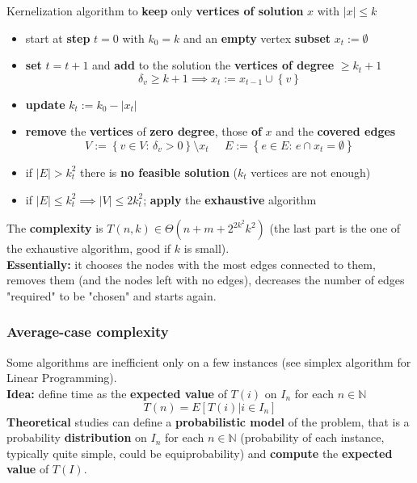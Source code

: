 Kernelization algorithm to \textbf{keep} only \textbf{vertices of solution} $x$ with $|x| \leq k$
\begin{itemize}
	\item start at \textbf{step} $t = 0$ with $k_0 = k$ and an \textbf{empty} vertex \textbf{subset} $x_t := \emptyset$
	\item \textbf{set} $t = t + 1$ and \textbf{add} to the solution the \textbf{vertices of degree} $\geq k_t + 1$
	$$ \delta_v \geq k+1 \implies x_t := x_{t-1} \cup \left\{v\right\} $$
	\item \textbf{update} $k_t := k_0 − |x_t|$
	\item \textbf{remove} the \textbf{vertices} of \textbf{zero degree}, those \textbf{of} $x$ and the \textbf{covered edges}
	$$ V := \left\{v \in V : \, \delta_v > 0\right\} \setminus x_t \;\;\;\;\; E := \left\{e \in E : \, e \cap x_t = \emptyset \right\} $$
	\item if $|E| > k_t^2$ there is \textbf{no feasible solution} ($k_t$ vertices are not enough)
	\item if $|E| \leq k_t^2 \implies |V| \leq 2k_t^2$; \textbf{apply} the \textbf{exhaustive} algorithm
\end{itemize}
The \textbf{complexity} is $T(n,k) \in \Theta \left(n + m + 2^{2k^2}k^2 \right)$ (the last part is the one of the exhaustive algorithm, good if $k$ is small).\\

\textbf{Essentially:} it chooses the nodes with the most edges connected to them, removes them (and the nodes left with no edges), decreases the number of edges "required" to be "chosen" and starts again.\\

\newpage

\subsubsection{Average-case complexity}
Some algorithms are inefficient only on a few instances (see simplex algorithm for Linear Programming).\\

\textbf{Idea:} define time as the \textbf{expected value} of $T(i)$ on $I_n$ for each $n \in \mathbb{N}$
$$ T(n) = E \left[T(i) | i \in I_n \right]$$
\textbf{Theoretical} studies can define a \textbf{probabilistic model} of the problem, that is a probability \textbf{distribution} on $I_n$ for each $n \in \mathbb{N}$ (probability of each instance, typically quite simple, could be equiprobability) and \textbf{compute} the \textbf{expected value} of $T(I)$.\\

